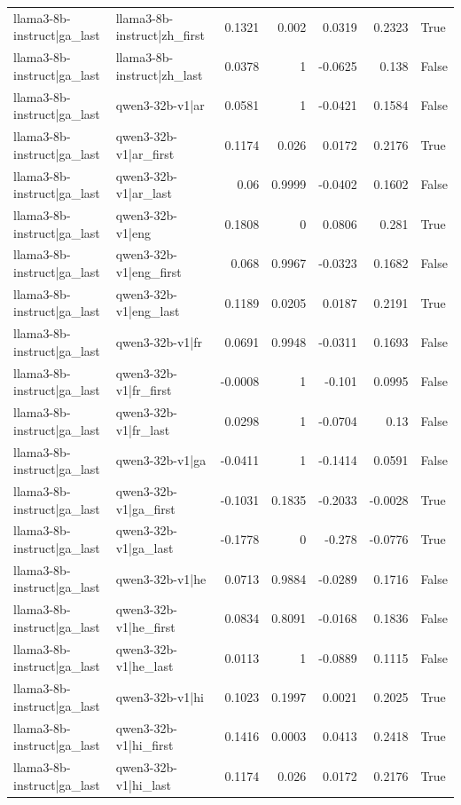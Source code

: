 \begin{table}
\begin{tabular}{l l r r r r l}
llama3-8b-instruct|ga_last & llama3-8b-instruct|zh_first & 0.1321 & 0.002 & 0.0319 & 0.2323 & True \\
llama3-8b-instruct|ga_last & llama3-8b-instruct|zh_last & 0.0378 & 1 & -0.0625 & 0.138 & False \\
llama3-8b-instruct|ga_last & qwen3-32b-v1|ar & 0.0581 & 1 & -0.0421 & 0.1584 & False \\
llama3-8b-instruct|ga_last & qwen3-32b-v1|ar_first & 0.1174 & 0.026 & 0.0172 & 0.2176 & True \\
llama3-8b-instruct|ga_last & qwen3-32b-v1|ar_last & 0.06 & 0.9999 & -0.0402 & 0.1602 & False \\
llama3-8b-instruct|ga_last & qwen3-32b-v1|eng & 0.1808 & 0 & 0.0806 & 0.281 & True \\
llama3-8b-instruct|ga_last & qwen3-32b-v1|eng_first & 0.068 & 0.9967 & -0.0323 & 0.1682 & False \\
llama3-8b-instruct|ga_last & qwen3-32b-v1|eng_last & 0.1189 & 0.0205 & 0.0187 & 0.2191 & True \\
llama3-8b-instruct|ga_last & qwen3-32b-v1|fr & 0.0691 & 0.9948 & -0.0311 & 0.1693 & False \\
llama3-8b-instruct|ga_last & qwen3-32b-v1|fr_first & -0.0008 & 1 & -0.101 & 0.0995 & False \\
llama3-8b-instruct|ga_last & qwen3-32b-v1|fr_last & 0.0298 & 1 & -0.0704 & 0.13 & False \\
llama3-8b-instruct|ga_last & qwen3-32b-v1|ga & -0.0411 & 1 & -0.1414 & 0.0591 & False \\
llama3-8b-instruct|ga_last & qwen3-32b-v1|ga_first & -0.1031 & 0.1835 & -0.2033 & -0.0028 & True \\
llama3-8b-instruct|ga_last & qwen3-32b-v1|ga_last & -0.1778 & 0 & -0.278 & -0.0776 & True \\
llama3-8b-instruct|ga_last & qwen3-32b-v1|he & 0.0713 & 0.9884 & -0.0289 & 0.1716 & False \\
llama3-8b-instruct|ga_last & qwen3-32b-v1|he_first & 0.0834 & 0.8091 & -0.0168 & 0.1836 & False \\
llama3-8b-instruct|ga_last & qwen3-32b-v1|he_last & 0.0113 & 1 & -0.0889 & 0.1115 & False \\
llama3-8b-instruct|ga_last & qwen3-32b-v1|hi & 0.1023 & 0.1997 & 0.0021 & 0.2025 & True \\
llama3-8b-instruct|ga_last & qwen3-32b-v1|hi_first & 0.1416 & 0.0003 & 0.0413 & 0.2418 & True \\
llama3-8b-instruct|ga_last & qwen3-32b-v1|hi_last & 0.1174 & 0.026 & 0.0172 & 0.2176 & True \\

\end{tabular}
\end{table}
